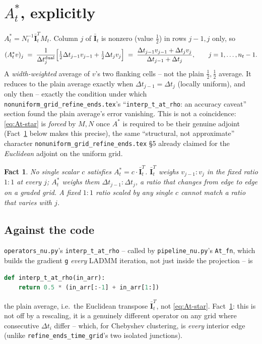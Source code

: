 \documentclass[11pt]{article}
\newtheorem{fact}{Fact}
\newcommand{\dt}{\Delta t}
\newcommand{\code}[1]{\texttt{#1}}
\begin{document}
\section{$A_t^*$, explicitly}
\label{sec:At}

$A_t^*=N_t^{-1}\bar{\mathbf I}_t^TM_t$. Column $j$ of $\bar{\mathbf I}_t$ is nonzero
(value $\tfrac12$) in rows $j-1,j$ only, so
\begin{equation}
  \label{eq:At-star}
  (A_t^*v)_j \;=\; \frac{1}{\dt_j^{\mathrm{dual}}}\Bigl[\tfrac12\dt_{j-1}v_{j-1}+\tfrac12
  \dt_jv_j\Bigr] \;=\; \frac{\dt_{j-1}v_{j-1}+\dt_jv_j}{\dt_{j-1}+\dt_j}, \qquad
  j=1,\ldots,n_t-1.
\end{equation}
A \emph{width-weighted} average of $v$'s two flanking cells -- not the plain $\tfrac12,
\tfrac12$ average. It reduces to the plain average exactly when $\dt_{j-1}=\dt_j$
(locally uniform), and only then -- exactly the condition under which
\code{nonuniform\_grid\_refine\_ends.tex}'s ``\code{interp\_t\_at\_rho}: an accuracy
caveat'' section found the plain average's error vanishing. This is not a coincidence:
\eqref{eq:At-star} is \emph{forced} by $M,N$ once $A^*$ is required to be their genuine
adjoint (Fact~\ref{fact:not-coincidence} below makes this precise), the same
``structural, not approximate'' character \code{nonuniform\_grid\_refine\_ends.tex}
\S5 already claimed for the \emph{Euclidean} adjoint on the uniform grid.

\begin{fact}
\label{fact:not-coincidence}
No single scalar $c$ satisfies $A_t^*=c\cdot\bar{\mathbf I}_t^T$. $\bar{\mathbf
I}_t^T$ weighs $v_{j-1}:v_j$ in the fixed ratio $1:1$ at every $j$; $A_t^*$ weighs them
$\dt_{j-1}:\dt_j$, a ratio that changes from edge to edge on a graded grid. A fixed $1:1$
ratio scaled by any single $c$ cannot match a ratio that varies with $j$.
\end{fact}

\subsection*{Against the code}

\code{operators\_nu.py}'s \code{interp\_t\_at\_rho} -- called by \code{pipeline\_nu.py}'s
\code{At\_fn}, which builds the gradient \code{g} \emph{every} LADMM iteration, not just
inside the projection -- is
\begin{lstlisting}[language=Python]
def interp_t_at_rho(in_arr):
    return 0.5 * (in_arr[:-1] + in_arr[1:])
\end{lstlisting}
the plain average, i.e.\ the Euclidean transpose $\bar{\mathbf I}_t^T$, not
\eqref{eq:At-star}. Fact~\ref{fact:not-coincidence}: this is not off by a rescaling, it is
a genuinely different operator on any grid where consecutive $\dt_i$ differ -- which, for
Chebyshev clustering, is \emph{every} interior edge (unlike
\code{refine\_ends\_time\_grid}'s two isolated junctions).
\end{document}
